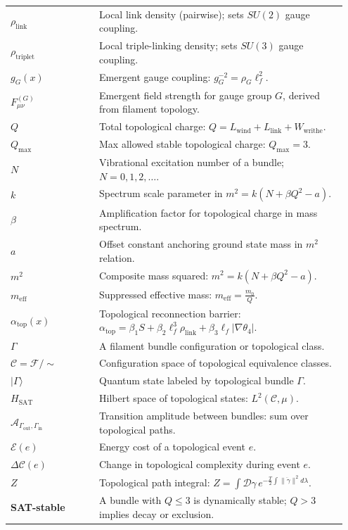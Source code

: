 \begin{longtable}{p{0.25\linewidth} p{0.7\linewidth}}
$\rho_{\mathrm{link}}$ & Local link density (pairwise); sets $SU(2)$ gauge coupling. \\
$\rho_{\mathrm{triplet}}$ & Local triple-linking density; sets $SU(3)$ gauge coupling. \\
$g_G(x)$ & Emergent gauge coupling: $g_G^{-2} = \rho_G \ell_f^2$. \\
$F_{\mu\nu}^{(G)}$ & Emergent field strength for gauge group $G$, derived from filament topology. \\
$Q$ & Total topological charge: $Q = L_{\text{wind}} + L_{\text{link}} + W_{\text{writhe}}$. \\
$Q_{\text{max}}$ & Max allowed stable topological charge: $Q_{\text{max}} = 3$. \\
$N$ & Vibrational excitation number of a bundle; $N=0,1,2,\dots$. \\
$k$ & Spectrum scale parameter in $m^2 = k(N + \beta Q^2 - a)$. \\
$\beta$ & Amplification factor for topological charge in mass spectrum. \\
$a$ & Offset constant anchoring ground state mass in $m^2$ relation. \\
$m^2$ & Composite mass squared: $m^2 = k(N + \beta Q^2 - a)$. \\
$m_{\text{eff}}$ & Suppressed effective mass: $m_{\text{eff}} = \frac{m_0}{Q}$. \\
$\alpha_{\mathrm{top}}(x)$ & Topological reconnection barrier: $\alpha_{\mathrm{top}} = \beta_1 S + \beta_2 \ell_f^3 \rho_{\text{link}} + \beta_3 \ell_f |\nabla \theta_4|$. \\
$\Gamma$ & A filament bundle configuration or topological class. \\
$\mathcal{C} = \mathcal{F}/\sim$ & Configuration space of topological equivalence classes. \\
$|\Gamma\rangle$ & Quantum state labeled by topological bundle $\Gamma$. \\
$H_{\mathrm{SAT}}$ & Hilbert space of topological states: $L^2(\mathcal{C}, \mu)$. \\
$\mathcal{A}_{\Gamma_{\text{out}}, \Gamma_{\text{in}}}$ & Transition amplitude between bundles: sum over topological paths. \\
$\mathcal{E}(e)$ & Energy cost of a topological event $e$. \\
$\Delta\mathcal{C}(e)$ & Change in topological complexity during event $e$. \\
$Z$ & Topological path integral: $Z = \int \mathcal{D}\gamma \, e^{-\frac{T}{2} \int \|\ddot{\gamma}\|^2 d\lambda}$. \\
\textbf{SAT-stable} & A bundle with $Q \leq 3$ is dynamically stable; $Q > 3$ implies decay or exclusion. \\
\end{longtable}
